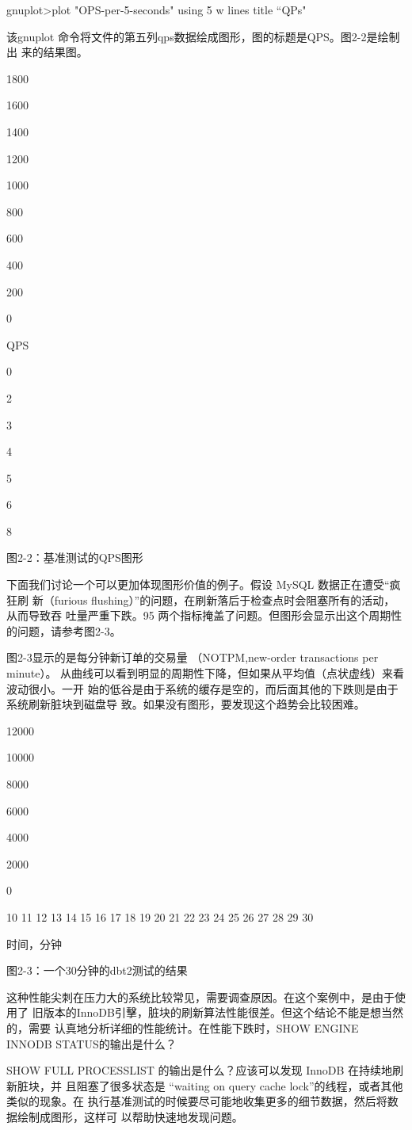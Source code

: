 gnuplot>plot "OPS-per-5-seconds" using 5 w lines title “QPs"

该gnuplot 命令将文件的第五列qps数据绘成图形，图的标题是QPS。图2-2是绘制出
来的结果图。

1800

1600

1400

1200

1000

800

600 ~

400

200

0

QPS

0

2

3

4

5

6

8

图2-2：基准测试的QPS图形

下面我们讨论一个可以更加体现图形价值的例子。假设 MySQL 数据正在遭受“疯狂刷
新（furious flushing）”的问题，在刷新落后于检查点时会阻塞所有的活动，从而导致吞
吐量严重下跌。95%
两个指标掩盖了问题。但图形会显示出这个周期性的问题，请参考图2-3。

图2-3显示的是每分钟新订单的交易量 （NOTPM,new-order transactions per minute）。
从曲线可以看到明显的周期性下降，但如果从平均值（点状虚线）来看波动很小。一开
始的低谷是由于系统的缓存是空的，而后面其他的下跌则是由于系统刷新脏块到磁盘导
致。如果没有图形，要发现这个趋势会比较困难。

12000

10000

8000

6000

4000

2000

0

10 11 12 13 14 15 16 17 18 19 20 21 22 23 24 25 26 27 28 29 30

时间，分钟

图2-3：一个30分钟的dbt2测试的结果

这种性能尖刺在压力大的系统比较常见，需要调查原因。在这个案例中，是由于使用了
旧版本的InnoDB引擊，脏块的刷新算法性能很差。但这个结论不能是想当然的，需要
认真地分析详细的性能统计。在性能下跌时，SHOW ENGINE INNODB STATUS的输出是什么？

SHOW FULL PROCESSLIST 的输出是什么？应该可以发现 InnoDB 在持续地刷新脏块，并
且阻塞了很多状态是 “waiting on query cache lock”的线程，或者其他类似的现象。在
执行基准测试的时候要尽可能地收集更多的细节数据，然后将数据绘制成图形，这样可
以帮助快速地发现问题。

